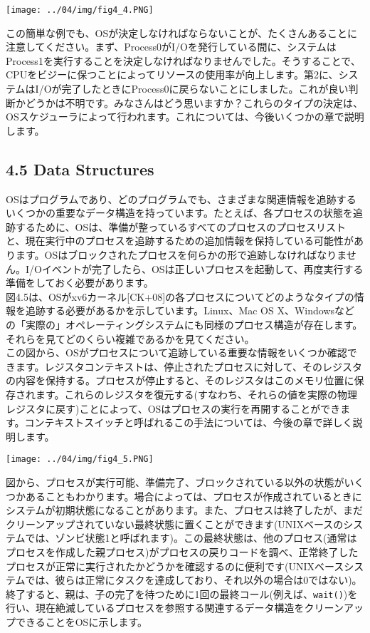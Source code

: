 \texttt{[image: ../04/img/fig4\_4.PNG]}

この簡単な例でも、OSが決定しなければならないことが、たくさんあることに注意してください。まず、Process0がI/Oを発行している間に、システムはProcess1を実行することを決定しなければなりませんでした。そうすることで、CPUをビジーに保つことによってリソースの使用率が向上します。第2に、システムはI/Oが完了したときにProcess0に戻らないことにしました。これが良い判断かどうかは不明です。みなさんはどう思いますか？これらのタイプの決定は、OSスケジューラによって行われます。これについては、今後いくつかの章で説明します。

\hypertarget{data-structures}{%
\subsection*{4.5 Data Structures}\label{data-structures}}

OSはプログラムであり、どのプログラムでも、さまざまな関連情報を追跡するいくつかの重要なデータ構造を持っています。たとえば、各プロセスの状態を追跡するために、OSは、準備が整っているすべてのプロセスのプロセスリストと、現在実行中のプロセスを追跡するための追加情報を保持している可能性があります。OSはブロックされたプロセスを何らかの形で追跡しなければなりません。I/Oイベントが完了したら、OSは正しいプロセスを起動して、再度実行する準備をしておく必要があります。\\
図4.5は、OSがxv6カーネル{[}CK+08{]}の各プロセスについてどのようなタイプの情報を追跡する必要があるかを示しています。Linux、Mac
OS
X、Windowsなどの「実際の」オペレーティングシステムにも同様のプロセス構造が存在します。それらを見てどのくらい複雑であるかを見てください。\\
この図から、OSがプロセスについて追跡している重要な情報をいくつか確認できます。レジスタコンテキストは、停止されたプロセスに対して、そのレジスタの内容を保持する。プロセスが停止すると、そのレジスタはこのメモリ位置に保存されます。これらのレジスタを復元する(すなわち、それらの値を実際の物理レジスタに戻す)ことによって、OSはプロセスの実行を再開することができます。コンテキストスイッチと呼ばれるこの手法については、今後の章で詳しく説明します。

\texttt{[image: ../04/img/fig4\_5.PNG]}

図から、プロセスが実行可能、準備完了、ブロックされている以外の状態がいくつかあることもわかります。場合によっては、プロセスが作成されているときにシステムが初期状態になることがあります。また、プロセスは終了したが、まだクリーンアップされていない最終状態に置くことができます(UNIXベースのシステムでは、ゾンビ状態1と呼ばれます)。この最終状態は、他のプロセス(通常はプロセスを作成した親プロセス)がプロセスの戻りコードを調べ、正常終了したプロセスが正常に実行されたかどうかを確認するのに便利です(UNIXベースシステムでは、彼らは正常にタスクを達成しており、それ以外の場合は0ではない)。終了すると、親は、子の完了を待つために1回の最終コール(例えば、\texttt{wait()})を行い、現在絶滅しているプロセスを参照する関連するデータ構造をクリーンアップできることをOSに示します。

